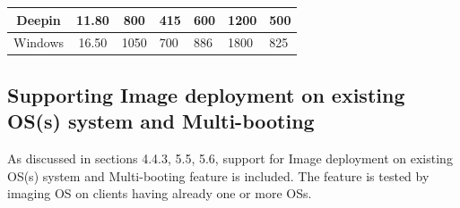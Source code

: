 \documentclass[a4paper,12pt]{article}
\begin{document}
\begin{table}[H]
\begin{tabular}{|c|c|c|l|l|l|l|}
Deepin       & 11.80                                                                 & 800                                                                       & 415                                                                               & 600                                                                         & 1200                                                                             & 500                                                                          \\ \hline
Windows      & 16.50                                                                 & 1050                                                                      & 700                                                                               & 886                                                                         & 1800                                                                             & 825                                                                          \\ \hline
\end{tabular}

\label{imaging}
\end{table}



\subsection{ Supporting Image deployment on existing OS(s) system and Multi-booting }
As discussed in sections 4.4.3, 5.5, 5.6, support for Image deployment on existing OS(s) system and Multi-booting feature is included. The feature is tested by imaging OS on clients having already one or more OSs.
\end{document}
